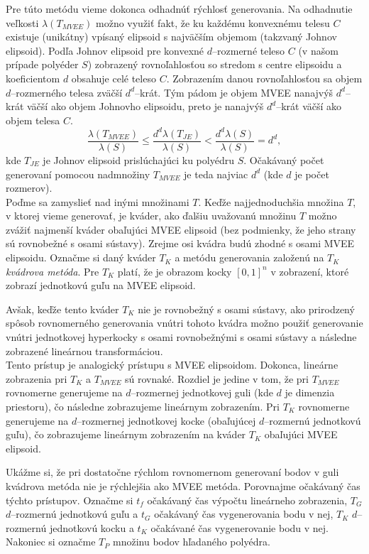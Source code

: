 Pre túto metódu vieme dokonca odhadnúť rýchlosť generovania. Na odhadnutie veľkosti $\lambda(T_{MVEE})$ možno využiť fakt, že ku každému konvexnému telesu $C$ existuje (unikátny) vpísaný elipsoid s najväčším objemom (takzvaný Johnov elipsoid). Podľa \cite{ellipsoids_ball} Johnov elipsoid pre konvexné $d$--rozmerné teleso $C$ (v našom prípade polyéder $S$) zobrazený rovnoľahlosťou so stredom s centre elipsoidu a koeficientom $d$ obsahuje celé teleso $C$. Zobrazením danou rovnoľahlosťou sa objem $d$--rozmerného telesa zväčší $d^d$--krát. Tým pádom je objem MVEE nanajvýš $d^d$--krát väčší ako objem Johnovho elipsoidu, preto je nanajvýš $d^d$--krát väčší ako objem telesa $C$.
$$\frac {\lambda(T_{MVEE})}{\lambda(S)} \leq \frac{d^d\lambda(T_{JE})}{\lambda(S)} < \frac{d^d\lambda(S)}{\lambda(S)}=d^d,$$ kde $T_{JE}$ je Johnov elipsoid prislúchajúci ku polyédru $S$. Očakávaný počet generovaní pomocou nadmnožiny $T_{MVEE}$ je teda najviac $d^d$ (kde $d$ je počet rozmerov).\\

Poďme sa zamyslieť nad inými množinami $T$. Keďže najjednoduchšia množina $T$, v ktorej vieme generovať, je kváder, ako ďalšiu uvažovanú množinu $T$ možno zvážiť najmenší kváder obaľujúci MVEE elipsoid (bez podmienky, že jeho strany sú rovnobežné s osami sústavy). Zrejme osi kvádra budú zhodné s osami MVEE elipsoidu. Označme si daný kváder $T_K$ a metódu generovania založenú na $T_K$ \textit{kvádrova metóda}. Pre $T_K$ platí, že je obrazom kocky $[0,1]^n$ v zobrazení, ktoré zobrazí jednotkovú guľu na MVEE elipsoid.

Avšak, keďže tento kváder $T_K$ nie je rovnobežný s osami sústavy, ako prirodzený spôsob rovnomerného generovania vnútri tohoto kvádra možno použiť generovanie vnútri jednotkovej hyperkocky s osami rovnobežnými s osami sústavy a následne zobrazené lineárnou transformáciou.\\

Tento prístup je analogický prístupu s MVEE elipsoidom. Dokonca, lineárne zobrazenia pri $T_K$ a $T_{MVEE}$ sú rovnaké. Rozdiel je jedine v tom, že pri $T_{MVEE}$ rovnomerne generujeme na $d$--rozmernej jednotkovej guli (kde $d$ je dimenzia priestoru), čo následne zobrazujeme lineárnym zobrazením. Pri $T_K$ rovnomerne generujeme na $d$--rozmernej jednotkovej kocke (obaľujúcej $d$--rozmernú jednotkovú guľu), čo zobrazujeme lineárnym zobrazením na kváder $T_K$ obaľujúci MVEE elipsoid.

Ukážme si, že pri dostatočne rýchlom rovnomernom generovaní bodov v guli kvádrova metóda nie je rýchlejšia ako MVEE metóda. Porovnajme očakávaný čas týchto prístupov. Označme si $t_f$ očakávaný čas výpočtu lineárneho zobrazenia, $T_G$ $d$--rozmernú jednotkovú guľu a $t_G$ očakávaný čas vygenerovania bodu v nej, $T_K$ $d$--rozmernú jednotkovú kocku a $t_K$ očakávané čas vygenerovanie bodu v nej. Nakoniec si označme $T_P$ množinu bodov hľadaného polyédra.


